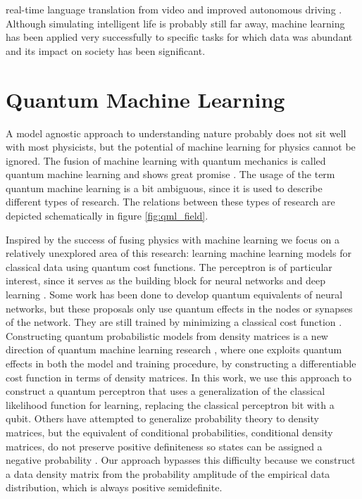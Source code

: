 real-time language translation from video \cite{GoogleTranslate} and improved autonomous driving \cite{Ouyang2013, Zhu2016}. Although simulating intelligent life is probably still far away, machine learning has been applied very successfully to specific tasks for which data was abundant and its impact on society has been significant.

\section{Quantum Machine Learning}

A model agnostic approach to understanding nature probably does not sit well with most physicists, but the potential of machine learning for physics cannot be ignored. The fusion of machine learning with quantum mechanics is called quantum machine learning and shows great promise \cite{Biamonte2017}. The usage of the term quantum machine learning is a bit ambiguous, since it is used to describe different types of research. The relations between these types of research are depicted schematically in figure \ref{fig:qml_field}.\newline

\noindent Inspired by the success of fusing physics with machine learning we focus on a relatively unexplored area of this research: learning machine learning models for classical data using quantum cost functions. The perceptron is of particular interest, since it serves as the building block for neural networks and deep learning \cite{LeCun2015}. Some work has been done to develop quantum equivalents of neural networks, but these proposals only use quantum effects in the nodes or synapses of the network. They are still trained by minimizing a classical cost function \cite{Zhou1999, Kouda2005, Zhou2007, Altaisky2013, Xuan2011, Shang2015, Schuld2014, Jeswal2018}. Constructing quantum probabilistic models from density matrices is a new direction of quantum machine learning research \cite{Amin2018, Kappen2018}, where one exploits quantum effects in both the model and training procedure, by constructing a differentiable cost function in terms of density matrices. In this work, we use this approach to construct a quantum perceptron that uses a generalization of the classical likelihood function for learning, replacing the classical perceptron bit with a qubit. Others have attempted to generalize probability theory to density matrices, but the equivalent of conditional probabilities, conditional density matrices, do not preserve positive definiteness so states can be assigned a negative probability \cite{Cerf1999, Warmuth2006}. Our approach bypasses this difficulty because we construct a data density matrix from the probability amplitude of the empirical data distribution, which is always positive semidefinite. \newline


